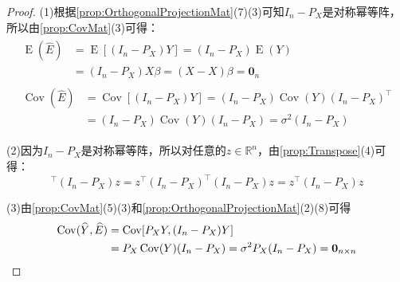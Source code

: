 \begin{proof}
	(1)根据\cref{prop:OrthogonalProjectionMat}(7)(3)可知$I_n-P_X$是对称幂等阵，所以由\cref{prop:CovMat}(3)可得：
	\begin{gather*}
		\begin{aligned}
			\operatorname{E}(\widehat{E})&=\operatorname{E}[(I_n-P_X)Y]=(I_n-P_X)\operatorname{E}(Y) \\
			&=(I_n-P_X)X\beta=(X-X)\beta=\mathbf{0}_n
		\end{aligned} \\
		\begin{aligned}
			\operatorname{Cov}(\widehat{E})&=\operatorname{Cov}[(I_n-P_X)Y]=(I_n-P_X)\operatorname{Cov}(Y)(I_n-P_X)^{\top} \\
			&=(I_n-P_X)\operatorname{Cov}(Y)(I_n-P_X)=\sigma^2(I_n-P_X)
		\end{aligned}
	\end{gather*}\par
	(2)因为$I_n-P_X$是对称幂等阵，所以对任意的$z\in\mathbb{R}^n$，由\cref{prop:Transpose}(4)可得：
	\begin{equation*}
		[(I_n-P_X)z]^{\top}(I_n-P_X)z=z^{\top}(I_n-P_X)^{\top}(I_n-P_X)z=z^{\top}(I_n-P_X)z
	\end{equation*}\par
	(3)由\cref{prop:CovMat}(5)(3)和\cref{prop:OrthogonalProjectionMat}(2)(8)可得
	\begin{align*}
		\operatorname{Cov}(\widehat{Y},\widehat{E})&=\operatorname{Cov}[P_XY,(I_n-P_X)Y] \\
		&=P_X\operatorname{Cov}(Y)(I_n-P_X)=\sigma^2P_X(I_n-P_X)=\mathbf{0}_{n\times n}\qedhere
	\end{align*}
\end{proof}
